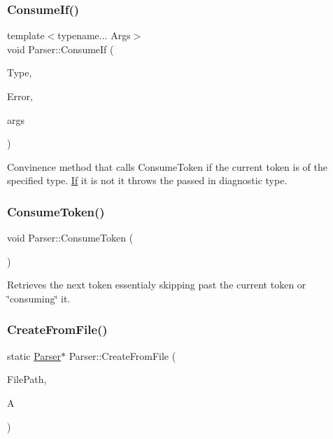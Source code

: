 \subsubsection{\texorpdfstring{ConsumeIf()}{ConsumeIf()}\hspace{0.1cm}{\footnotesize\ttfamily [2/2]}}
{\footnotesize\ttfamily template$<$typename... Args$>$ \\
void Parser\+::\+Consume\+If (\begin{DoxyParamCaption}\item[{Token\+Type\+::\+Token\+Type}]{Type,  }\item[{Diag\+Type\+::\+Diag\+Type}]{Error,  }\item[{Args \&\&...}]{args }\end{DoxyParamCaption})\hspace{0.3cm}{\ttfamily [inline]}}

Convinence method that calls {\ttfamily Consume\+Token} if the current token is of the specified type. \mbox{\hyperlink{class_if}{If}} it is not it throws the passed in diagnostic type. \mbox{\label{class_parser_a8d2f5841105233ab7fb81011e6fdc9a4}} 
\subsubsection{\texorpdfstring{ConsumeToken()}{ConsumeToken()}}
{\footnotesize\ttfamily void Parser\+::\+Consume\+Token (\begin{DoxyParamCaption}{ }\end{DoxyParamCaption})}

Retrieves the next token essentialy skipping past the current token or \char`\"{}consuming\char`\"{} it. \mbox{\label{class_parser_a9dec351ab37990879df527597383442a}} 
\subsubsection{\texorpdfstring{CreateFromFile()}{CreateFromFile()}}
{\footnotesize\ttfamily static \mbox{\hyperlink{class_parser}{Parser}}$\ast$ Parser\+::\+Create\+From\+File (\begin{DoxyParamCaption}\item[{std\+::string}]{File\+Path,  }\item[{class \mbox{\hyperlink{class_a_s_t}{A\+ST}} \&}]{A }\end{DoxyParamCaption})\hspace{0.3cm}{\ttfamily [static]}}

